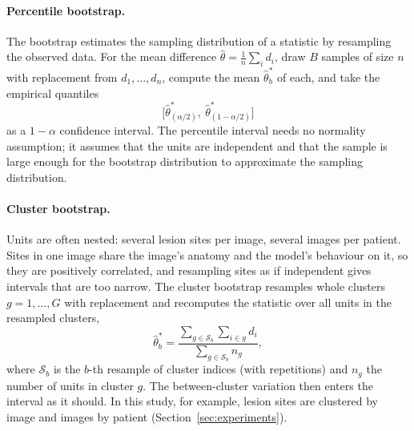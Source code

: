 \paragraph{Percentile bootstrap.} The bootstrap \citep{efron1993bootstrap} estimates the sampling distribution of a statistic by resampling the
observed data. For the mean difference $\hat\theta=\frac1n\sum_i d_i$, draw $B$ samples of size $n$ with replacement from $d_1,\dots,d_n$,
compute the mean $\hat\theta^{\ast}_b$ of each, and take the empirical quantiles
\begin{equation}
\big[\hat\theta^{\ast}_{(\alpha/2)},\ \hat\theta^{\ast}_{(1-\alpha/2)}\big]
\label{eq:bg_boot}
\end{equation}
as a $1-\alpha$ confidence interval. The percentile interval needs no normality assumption; it assumes that the units are independent and that the
sample is large enough for the bootstrap distribution to approximate the sampling distribution.

\paragraph{Cluster bootstrap.} Units are often nested: several lesion sites per image, several images per patient. Sites in one image share the
image's anatomy and the model's behaviour on it, so they are positively correlated, and resampling sites as if independent gives intervals that
are too narrow. The cluster bootstrap resamples whole clusters $g=1,\dots,G$ with replacement and recomputes the statistic over all units in the
resampled clusters,
\begin{equation}
\hat\theta^{\ast}_b=\frac{\sum_{g\in\mathcal{S}_b}\sum_{i\in g}d_i}{\sum_{g\in\mathcal{S}_b}n_g},
\label{eq:bg_clusterboot}
\end{equation}
where $\mathcal{S}_b$ is the $b$-th resample of cluster indices (with repetitions) and $n_g$ the number of units in cluster $g$. The between-cluster
variation then enters the interval as it should. In this study, for example, lesion sites are clustered by image and images by patient
(Section~\ref{sec:experiments}).

